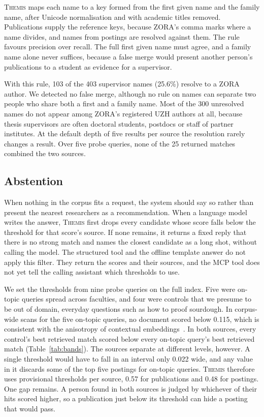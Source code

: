 \documentclass[sigconf,nonacm]{acmart}
\newcommand{\sys}{\textsc{Themis}}
\begin{document}
\sys{} maps each name to a key formed from the first given name and the family name, after Unicode normalisation and with academic titles removed. Publications supply the reference keys, because ZORA's comma marks where a name divides, and names from postings are resolved against them. The rule favours precision over recall. The full first given name must agree, and a family name alone never suffices, because a false merge would present another person's publications to a student as evidence for a supervisor.

With this rule, 103 of the 403 supervisor names (25.6\%) resolve to a ZORA author. We detected no false merge, although no rule on names can separate two people who share both a first and a family name. Most of the 300 unresolved names do not appear among ZORA's registered UZH authors at all, because thesis supervisors are often doctoral students, postdocs or staff of partner institutes. At the default depth of five results per source the resolution rarely changes a result. Over five probe queries, none of the 25 returned matches combined the two sources.

\subsection{Abstention}\label{sec:abstain}

When nothing in the corpus fits a request, the system should say so rather than present the nearest researchers as a recommendation. When a language model writes the answer, \sys{} first drops every candidate whose score falls below the threshold for that score's source. If none remains, it returns a fixed reply that there is no strong match and names the closest candidate as a long shot, without calling the model. The structured tool and the offline template answer do not apply this filter. They return the scores and their sources, and the MCP tool does not yet tell the calling assistant which thresholds to use.

We set the thresholds from nine probe queries on the full index. Five were on-topic queries spread across faculties, and four were controls that we presume to be out of domain, everyday questions such as how to proof sourdough. In corpus-wide scans for the five on-topic queries, no document scored below 0.115, which is consistent with the anisotropy of contextual embeddings~\cite{ethayarajh2019contextual}. In both sources, every control's best retrieved match scored below every on-topic query's best retrieved match (Table~\ref{tab:bands}). The sources separate at different levels, however. A single threshold would have to fall in an interval only 0.022 wide, and any value in it discards some of the top five postings for on-topic queries. \sys{} therefore uses provisional thresholds per source, 0.57 for publications and 0.48 for postings. One gap remains. A person found in both sources is judged by whichever of their hits scored higher, so a publication just below its threshold can hide a posting that would pass.
\end{document}

